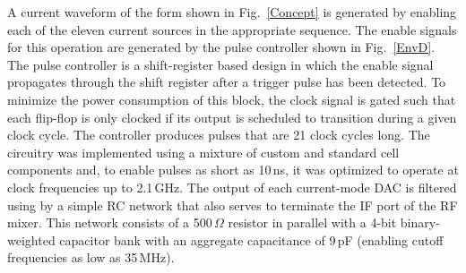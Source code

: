 \documentclass[journal]{IEEEtran}
\newcommand{\CR}[1]{{\color{black}#1}}
\begin{document}
A current waveform of the form shown in Fig.~\ref{Concept} is generated by enabling each of the eleven current sources in the appropriate sequence. The  enable signals for this operation are generated by the pulse controller shown in Fig.~\ref{EnvD}. The pulse controller is a shift-register based design in which the enable signal propagates through the shift register after a trigger pulse has been detected. To minimize the power consumption of this block, the clock signal is gated such that each flip-flop is only clocked if its output is \CR{scheduled} to transition during a given clock cycle. \CR{The controller produces pulses that are 21 clock cycles long. The circuitry was implemented using a mixture of custom and standard cell components and, to enable pulses as short as 10\,ns, it was optimized to operate at clock frequencies up to 2.1\,GHz. The output of each current-mode DAC is filtered using by a simple RC network that also serves to terminate the IF port of the RF mixer. This network consists of a 500\,$\Omega$ resistor in parallel with a 4-bit binary-weighted capacitor bank with an aggregate capacitance of 9\,pF (enabling cutoff frequencies as low as 35\,MHz).} %
\end{document}
